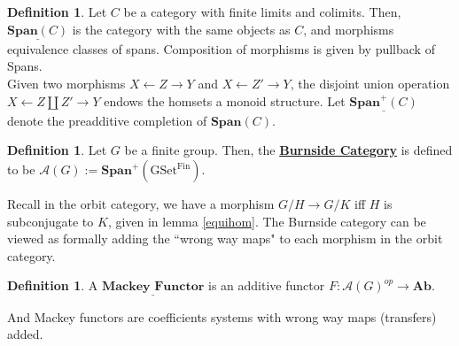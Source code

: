 \documentclass{article}
\theoremstyle{definition}
\newtheorem{definition}[theorem]{Definition}
\begin{document}
\begin{tcolorbox}[colback=purple!5!white,colframe=purple!75!black]
\begin{definition}
Let $C$ be a category with finite limits and colimits. Then, $\underline{\textbf{Span}(C)}$ is the category with the same objects as $C$, and morphisms equivalence classes of spans. Composition of morphisms is given by pullback of Spans.\\

Given two morphisms $X\leftarrow Z\rightarrow Y$ and $X\leftarrow Z'\rightarrow Y$, the disjoint union operation $X\leftarrow Z\coprod Z'\rightarrow Y$ endows the homsets a monoid structure. Let $\underline{\textbf{Span}^+(C)}$ denote the preadditive completion of $\textbf{Span}(C)$. 
\end{definition}
\end{tcolorbox}



\begin{tcolorbox}[colback=purple!5!white,colframe=purple!75!black]
\begin{definition}
Let $G$ be a finite group. Then, the \underline{\textbf{Burnside Category}} is defined to be $\mathcal{A}(G):=\textbf{Span}^+(\textrm{GSet}^{\textrm{Fin}})$.
\end{definition}
\end{tcolorbox}
Recall in the orbit category, we have a morphism $G/H\to G/K$ iff $H$ is subconjugate to $K$, given in lemma \ref{equihom}. The Burnside category can be viewed as formally adding the ``wrong way maps" to each morphism in the orbit category. 

\begin{tcolorbox}[colback=purple!5!white,colframe=purple!75!black]
\begin{definition}
A $\underline{\textbf{Mackey Functor}}$ is an additive functor $F: \mathcal{A}(G)^{op}\to \textbf{Ab}$. 
\end{definition}
\end{tcolorbox}
And Mackey functors are coefficients systems with wrong way maps (transfers) added. 
\end{document}
